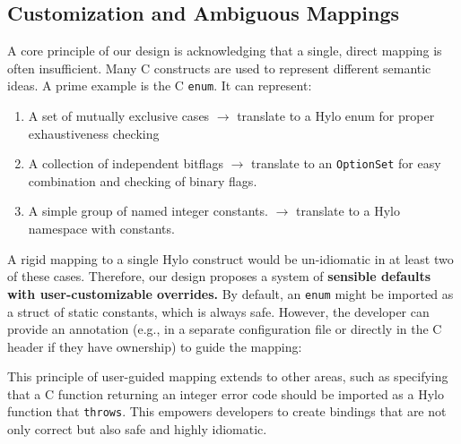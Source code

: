 \subsection{Customization and Ambiguous Mappings}

A core principle of our design is acknowledging that a single, direct mapping is often insufficient. Many C constructs are used to represent different semantic ideas. A prime example is the C \texttt{enum}. It can represent:
\begin{enumerate}
    \item A set of mutually exclusive cases \(\rightarrow\) translate to a Hylo enum for proper exhaustiveness checking
    \item A collection of independent bitflags \(\rightarrow\) translate to an \texttt{OptionSet} \cite{OptionSet} for easy combination and checking of binary flags.
    \item A simple group of named integer constants. \(\rightarrow\) translate to a Hylo namespace with constants.
\end{enumerate}
A rigid mapping to a single Hylo construct would be un-idiomatic in at least two of these cases. Therefore, our design proposes a system of \textbf{sensible defaults with user-customizable overrides.} By default, an \texttt{enum} might be imported as a struct of static constants, which is always safe. However, the developer can provide an annotation (e.g., in a separate configuration file or directly in the C header if they have ownership) to guide the mapping:

This principle of user-guided mapping extends to other areas, such as specifying that a C function returning an integer error code should be imported as a Hylo function that \texttt{throws}. This empowers developers to create bindings that are not only correct but also safe and highly idiomatic.
